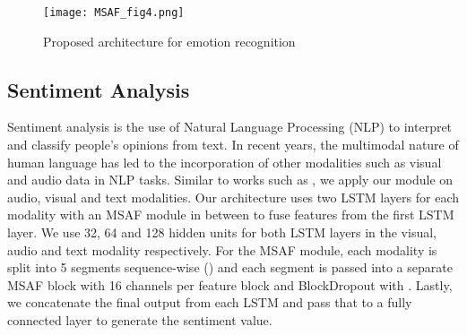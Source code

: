 \documentclass[10pt,twocolumn,letterpaper]{article}
\begin{document}
\begin{figure}[ht]
\centering
\texttt{[image: MSAF\_fig4.png]} \caption{Proposed architecture for emotion recognition}
\label{fig4}
\end{figure}

\subsection{Sentiment Analysis}
Sentiment analysis is the use of Natural Language Processing (NLP) to interpret and classify people’s opinions from text. In recent years, the multimodal nature of human language has led to the incorporation of other modalities such as visual and audio data in NLP tasks. Similar to works such as \cite{sun2019learning,hazarika2020misa}, we apply our module on audio, visual and text modalities. Our architecture uses two LSTM layers for each modality with an MSAF module in between to fuse features from the first LSTM layer. We use 32, 64 and 128 hidden units for both LSTM layers in the visual, audio and text modality respectively. For the MSAF module, each modality is split into 5 segments sequence-wise () and each segment is passed into a separate MSAF block with 16 channels per feature block and BlockDropout with . Lastly, we concatenate the final output from each LSTM and pass that to a fully connected layer to generate the sentiment value.
\end{document}
